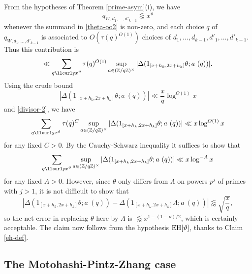 From the hypotheses of Theorem \ref{prime-asym}(i), we have
$$ q_{W,d_1,\dots,d'_{k-1}} \lessapprox x^\vartheta$$
whenever the summand in \eqref{theta-oo2} is non-zero, and each choice $q$ of $q_{W,d_1,\dots,d'_{k-1}}$ is associated to $O( \tau(q)^{O(1)} )$ choices of $d_1,\dots,d_{k-1},d'_1,\dots,d'_{k-1}$.  Thus this contribution is
$$
\ll \sum_{q \lessapprox x^\vartheta} \tau(q)^{O(1)} \sup_{a \in (\Z/q\Z)^\times} |\Delta( 1_{[x+h_k,2x+h_k]} \theta; a\ (q) )|.$$
Using the crude bound
$$ |\Delta( 1_{[x+h_k,2x+h_k]} \theta; a\ (q) )| \ll \frac{x}{q} \log^{O(1)} x$$
and \eqref{divisor-2}, we have
$$ \sum_{q \lessapprox x^\vartheta} \tau(q)^C \sup_{a \in (\Z/q\Z)^\times} |\Delta( 1_{[x+h_k,2x+h_k]} \theta; a\ (q) )| \ll x \log^{O(1)} x$$
for any fixed $C>0$. By the Cauchy-Schwarz inequality it suffices to show that
$$ \sum_{q \lessapprox x^\vartheta} \sup_{a \in (\Z/q\Z)^\times} |\Delta( 1_{[x+h_k,2x+h_k]} \theta; a\ (q) )| \ll x \log^{-A} x$$
for any fixed $A>0$.  However, since $\theta$ only differs from $\Lambda$ on powers $p^j$ of primes with $j>1$, it is not difficult to show that
$$  |\Delta( 1_{[x+h_k,2x+h_k]} \theta; a\ (q) ) -  \Delta( 1_{[x+h_k,2x+h_k]} \Lambda; a\ (q) )| \lessapprox \sqrt{\frac{x}{q}}, $$
so the net error in replacing $\theta$ here by $\Lambda$ is $\lessapprox x^{1 - (1-\vartheta)/2}$, which is certainly acceptable.  The claim now follows from the hypothesis $\operatorname*{EH}[\vartheta]$, thanks to Claim \ref{eh-def}.


\subsection{The Motohashi-Pintz-Zhang case}

